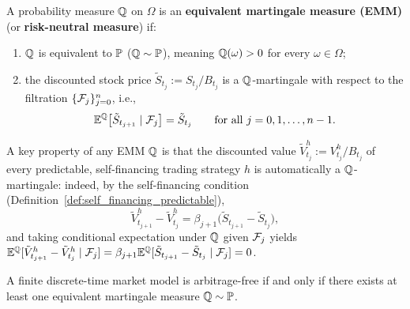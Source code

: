 \begin{definition}
\label{def:emm_discrete}
A probability measure $\mathbb{Q}$ on $\Omega$ is an \textbf{equivalent martingale measure (EMM)} (or \textbf{risk-neutral measure}) if:
\begin{enumerate}
    \item $\mathbb{Q}$ is equivalent to $\mathbb{P}$ ($\mathbb{Q} \sim \mathbb{P}$), meaning $\mathbb{Q}(\omega) > 0$ for every $\omega \in \Omega$;
    \item the discounted stock price $\tilde{S}_{t_j} := S_{t_j} / B_{t_j}$ is a $\mathbb{Q}$-martingale with respect to the filtration $\{\mathcal{F}_j\}_{j=0}^{n}$, i.e.,
    \[
        \mathbb{E}^{\mathbb{Q}}\bigl[\tilde{S}_{t_{j+1}} \mid \mathcal{F}_j\bigr] = \tilde{S}_{t_j} \qquad \text{for all } j = 0, 1, \dots, n - 1.
    \]
\end{enumerate}
\end{definition}

A key property of any EMM $\mathbb{Q}$ is that the discounted value $\tilde{V}_{t_j}^h := V_{t_j}^h / B_{t_j}$ of every predictable, self-financing trading strategy $h$ is automatically a $\mathbb{Q}$-martingale: indeed, by the self-financing condition (Definition~\ref{def:self_financing_predictable}),
\[
    \tilde{V}_{t_{j+1}}^h - \tilde{V}_{t_j}^h = \beta_{j+1}\bigl(\tilde{S}_{t_{j+1}} - \tilde{S}_{t_j}\bigr),
\]
and taking conditional expectation under $\mathbb{Q}$ given $\mathcal{F}_j$ yields $\mathbb{E}^{\mathbb{Q}}[\tilde{V}_{t_{j+1}}^h - \tilde{V}_{t_j}^h \mid \mathcal{F}_j] = \beta_{j+1} \mathbb{E}^{\mathbb{Q}}[\tilde{S}_{t_{j+1}} - \tilde{S}_{t_j} \mid \mathcal{F}_j] = 0$.

\begin{theorem}
\label{thm:ftap1_discrete}
A finite discrete-time market model is arbitrage-free if and only if there exists at least one equivalent martingale measure $\mathbb{Q} \sim \mathbb{P}$.
\end{theorem}

